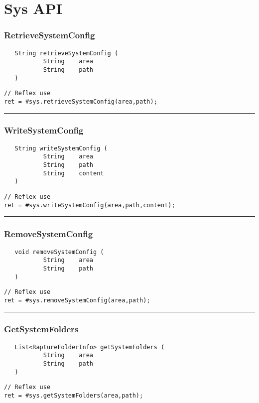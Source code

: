 \section{Sys API}

\subsubsection{RetrieveSystemConfig}
\label{Api:RetrieveSystemConfig}
\begin{verbatim}
   String retrieveSystemConfig (
           String    area
           String    path
   )
\end{verbatim}
\begin{lstlisting}[language=reflex]
// Reflex use
ret = #sys.retrieveSystemConfig(area,path);
\end{lstlisting}



\rule{15cm}{2pt}
\subsubsection{WriteSystemConfig}
\label{Api:WriteSystemConfig}
\begin{verbatim}
   String writeSystemConfig (
           String    area
           String    path
           String    content
   )
\end{verbatim}
\begin{lstlisting}[language=reflex]
// Reflex use
ret = #sys.writeSystemConfig(area,path,content);
\end{lstlisting}



\rule{15cm}{2pt}
\subsubsection{RemoveSystemConfig}
\label{Api:RemoveSystemConfig}
\begin{verbatim}
   void removeSystemConfig (
           String    area
           String    path
   )
\end{verbatim}
\begin{lstlisting}[language=reflex]
// Reflex use
ret = #sys.removeSystemConfig(area,path);
\end{lstlisting}



\rule{15cm}{2pt}
\subsubsection{GetSystemFolders}
\label{Api:GetSystemFolders}
\begin{verbatim}
   List<RaptureFolderInfo> getSystemFolders (
           String    area
           String    path
   )
\end{verbatim}
\begin{lstlisting}[language=reflex]
// Reflex use
ret = #sys.getSystemFolders(area,path);
\end{lstlisting}



